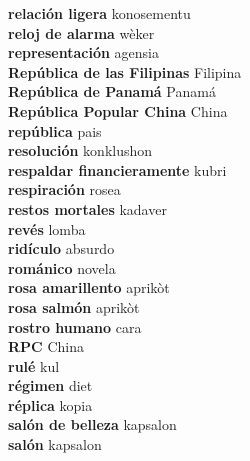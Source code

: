 \textbf{ relación ligera  } konosementu \\
\textbf{ reloj de alarma  } wèker \\
\textbf{ representación  } agensia \\
\textbf{ República de las Filipinas  } Filipina \\
\textbf{ República de Panamá  } Panamá \\
\textbf{ República Popular China  } China \\
\textbf{ república  } pais \\
\textbf{ resolución  } konklushon \\
\textbf{ respaldar financieramente  } kubri \\
\textbf{ respiración  } rosea \\
\textbf{ restos mortales  } kadaver \\
\textbf{ revés  } lomba \\
\textbf{ ridículo  } absurdo \\
\textbf{ románico  } novela \\
\textbf{ rosa amarillento  } aprikòt \\
\textbf{ rosa salmón  } aprikòt \\
\textbf{ rostro humano  } cara \\
\textbf{ RPC  } China \\
\textbf{ rulé  } kul \\
\textbf{ régimen  } diet \\
\textbf{ réplica  } kopia \\
\textbf{ salón de belleza  } kapsalon \\
\textbf{ salón  } kapsalon \\

